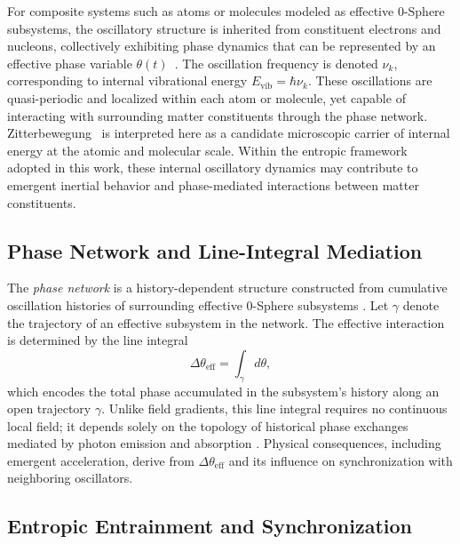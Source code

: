 \documentclass[
 reprint,
 amsmath,amssymb,
 aps,
 prb,
]{revtex4-2}
\numberwithin{equation}{section}
\begin{document}
For composite systems such as atoms or molecules modeled as effective 0-Sphere subsystems, the oscillatory structure is inherited from constituent electrons and nucleons, collectively exhibiting phase dynamics that can be represented by an effective phase variable $\theta(t)$~\cite{Hanamura2026Trilogy3,Hanamura2025Trilogy1}. The oscillation frequency is denoted $\nu_k$, corresponding to internal vibrational energy $E_\text{vib} = \hbar \nu_k$. These oscillations are quasi-periodic and localized within each atom or molecule, yet capable of interacting with surrounding matter constituents through the phase network. Zitterbewegung~\cite{Schrodinger1930,Dirac1928,Barut1981} is interpreted here as a candidate microscopic carrier of internal energy at the atomic and molecular scale. Within the entropic framework adopted in this work, these internal oscillatory dynamics may contribute to emergent inertial behavior and phase-mediated interactions between matter constituents.

\subsection{Phase Network and Line-Integral Mediation}

The \textit{phase network} is a history-dependent structure constructed from cumulative oscillation histories of surrounding effective 0-Sphere subsystems \cite{Hanamura2026Trilogy3}. Let $\gamma$ denote the trajectory of an effective subsystem in the network. The effective interaction is determined by the line integral
\begin{equation}
\Delta \theta_\text{eff} = \int_\gamma d\theta,
\label{eq:line_integral}
\end{equation}
which encodes the total phase accumulated in the subsystem's history along an open trajectory $\gamma$. Unlike field gradients, this line integral requires no continuous local field; it depends solely on the topology of historical phase exchanges mediated by photon emission and absorption \cite{AharonovBohm1959,Berry1984,WilsonLoop1974}. Physical consequences, including emergent acceleration, derive from $\Delta \theta_\text{eff}$ and its influence on synchronization with neighboring oscillators.

\subsection{Entropic Entrainment and Synchronization}
\end{document}
